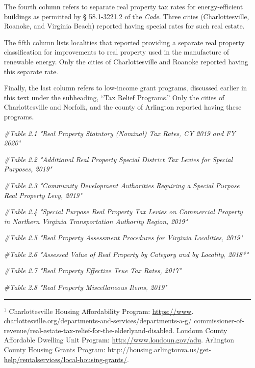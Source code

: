 \documentclass[
]{book}
\newenvironment{Shaded}{\begin{snugshade}}{\end{snugshade}}
\newcommand{\CommentTok}[1]{\textcolor[rgb]{0.56,0.35,0.01}{\textit{#1}}}
\begin{document}
The fourth column refers to separate real property tax rates for energy-efficient buildings as permitted by § 58.1-3221.2 of the \emph{Code}. Three cities (Charlottesville, Roanoke, and Virginia Beach) reported having special rates for such real estate.

The fifth column lists localities that reported providing a separate real property classification for improvements to real property used in the manufacture of renewable energy. Only the cities of Charlottesville and Roanoke reported having this separate rate.

Finally, the last column refers to low-income grant programs, discussed earlier in this text under the subheading, ``Tax Relief Programs.'' Only the cities of Charlottesville and Norfolk, and the county of Arlington reported having these programs.

\begin{Shaded}
\begin{Highlighting}[]
\CommentTok{\#Table 2.1 "Real Property Statutory (Nominal) Tax Rates, CY 2019 and FY 2020"}


\CommentTok{\#Table 2.2 "Additional Real Property Special District Tax Levies for Special Purposes, 2019"}


\CommentTok{\#Table 2.3 "Community Development Authorities Requiring a Special Purpose Real Property Levy, 2019" }


\CommentTok{\#Table 2.4 "Special Purpose Real Property Tax Levies on Commercial Property in Northern Virginia Transportation Authority Region, 2019" }


\CommentTok{\#Table 2.5 "Real Property Assessment Procedures for Virginia Localities, 2019" }


\CommentTok{\#Table 2.6 "Assessed Value of Real Property by Category and by Locality, 2018*"}


\CommentTok{\#Table 2.7 "Real Property Effective True Tax Rates, 2017"}


\CommentTok{\#Table 2.8 "Real Property Miscellaneous Items, 2019"}
\end{Highlighting}
\end{Shaded}

\begin{center}\rule{0.5\linewidth}{0.5pt}\end{center}

\(^1\) Charlottesville Housing Affordability Program: \url{https://www}.
charlottesville.org/departments-and-services/departments-a-g/
commissioner-of-revenue/real-estate-tax-relief-for-the-elderlyand-disabled. Loudoun County Affordable Dwelling Unit Program: \url{http://www.loudoun.gov/adu}. Arlington County Housing
Grants Program: \url{http://housing.arlingtonva.us/get-help/rentalservices/local-housing-grants/}.
\end{document}
